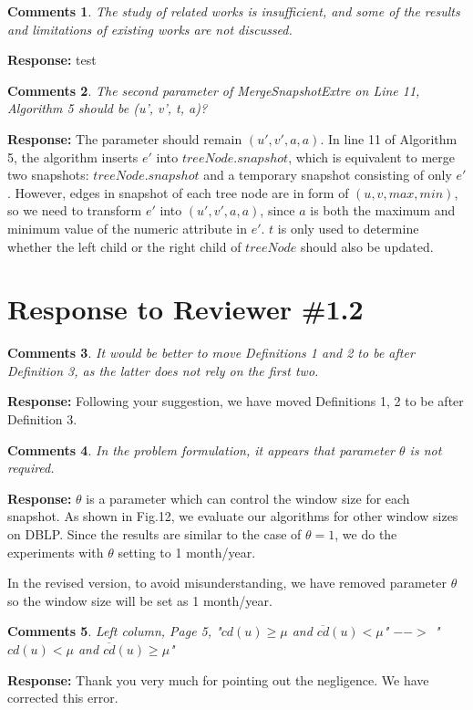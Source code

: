 \documentclass{article}
\newtheorem{Comments}{\textbf{Comments}}
\begin{document}
\begin{Comments}
The study of related works is insufficient, and some of the results and limitations of existing works are not discussed.
\end{Comments}
\noindent \textbf{Response:} test

\begin{Comments}
The second parameter of MergeSnapshotExtre on Line 11, Algorithm 5 should be (u’, v’, t, a)?
\end{Comments}
\noindent \textbf{Response:} The parameter should remain $ (u',v',a,a) $. In line 11 of Algorithm 5, the algorithm inserts $ e' $ into $ treeNode.snapshot $, which is equivalent to merge two snapshots: $ treeNode.snapshot $ and a temporary snapshot consisting of only $ e' $. However, edges in snapshot of each tree node are in form of $ (u,v,max,min) $, so we need to transform $ e' $ into $ (u',v',a,a) $, since $ a $ is both the maximum and minimum value of the numeric attribute in $ e' $. $ t $ is only used to determine whether the left child or the right child of $ treeNode $ should also be updated.



\section{Response to Reviewer \#1.2}
\setcounter{Comments}{0}
\begin{Comments}
It would be better to move Definitions 1 and 2 to be after Definition 3, as the latter does not rely on the first two.
\end{Comments}
\noindent \textbf{Response: } Following your suggestion, we have moved Definitions 1, 2 to be after Definition 3.


\begin{Comments}
In the problem formulation, it appears that parameter $\theta$ is not required.
\end{Comments}
\noindent \textbf{Response: } $\theta$ is a parameter which can control the window size for each snapshot. As shown in Fig.12, we evaluate our algorithms for other window sizes on DBLP. Since the results are similar to the case of $\theta=1$, we do the experiments with $\theta$ setting to 1 month/year.

In the revised version, to avoid misunderstanding, we have removed parameter $\theta$ so the window size will be set as 1 month/year.

\begin{Comments}
 Left column, Page 5, "$cd(u) \geq \mu$ and $\overline{cd}(u) < \mu$" $-->$ "$cd(u) < \mu$ and $\overline{cd}(u) \geq \mu$"
\end{Comments}
\noindent \textbf{Response: } Thank you very much for pointing out the negligence. We have corrected this error.
\end{document}
